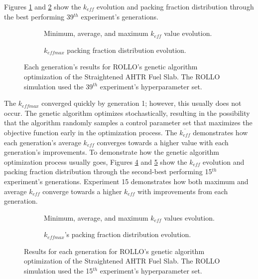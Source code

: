 Figures \ref{fig:keff_conv_39} and \ref{fig:pf_39} show the $k_{eff}$ evolution
and packing fraction distribution through the best performing 39$^{th}$ 
experiment's generations.
\begin{figure}[]
    \centering
    \begin{subfigure}{\textwidth}
    \caption{Minimum, average, and maximum $k_{eff}$ value evolution.}
    \label{fig:keff_conv_39}
    \end{subfigure}
    \begin{subfigure}{\textwidth}
        \caption{$k_{eff max}$ packing fraction distribution evolution.}
        \label{fig:pf_39}
    \end{subfigure}
    \caption{Each generation's results for \gls{ROLLO}'s genetic algorithm 
    optimization of the Straightened \acrfull{AHTR} Fuel Slab. The \gls{ROLLO} 
    simulation used the 39$^{th}$ experiment's hyperparameter set.}
    \label{fig:39}
\end{figure}
The $k_{eff max}$ converged quickly by generation 1; however, this usually 
does not occur. 
The genetic algorithm optimizes stochastically, resulting in the possibility 
that the algorithm randomly samples a control parameter set that maximizes 
the objective function early in the optimization process. 
The $\overline{k_{eff}}$ demonstrates how each generation's average $k_{eff}$
converges towards a higher value with each generation's improvements.
To demonstrate how the genetic algorithm optimization process usually goes, 
Figures \ref{fig:keff_conv_15} and \ref{fig:pf_15} show the $k_{eff}$ evolution 
and packing fraction distribution through the second-best performing 15$^{th}$ 
experiment's generations.  
Experiment 15 demonstrates how both maximum and average $k_{eff}$ converge
towards a higher $k_{eff}$ with improvements from each generation.
\begin{figure}[]
    \centering
    \begin{subfigure}{\textwidth}
    \caption{Minimum, average, and maximum $k_{eff}$ values evolution.}
    \label{fig:keff_conv_15}
    \end{subfigure}
    \begin{subfigure}{\textwidth}
        \caption{$k_{eff max}$'s packing fraction distribution evolution.}
        \label{fig:pf_15}
    \end{subfigure}
    \caption{ Results for each generation for \gls{ROLLO}'s genetic algorithm optimization 
    of the Straightened \acrfull{AHTR} Fuel Slab. The \gls{ROLLO} simulation used 
    the 15$^{th}$ experiment's hyperparameter set.}
    \label{fig:15}
\end{figure}

